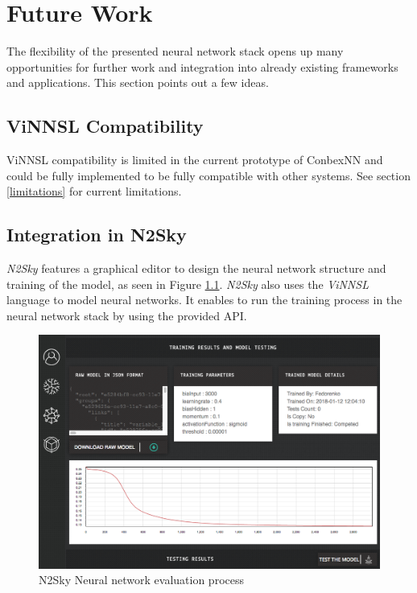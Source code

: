 \chapter{Future Work}\label{future-work}

The flexibility of the presented neural network stack opens up many
opportunities for further work and integration into already existing
frameworks and applications. This section points out a few ideas.

\section{ViNNSL Compatibility}\label{vinnsl-compatibility}

ViNNSL compatibility is limited in the current prototype of ConbexNN and
could be fully implemented to be fully compatible with other systems.
See section \ref{limitations} for current limitations.

\section{Integration in N2Sky}\label{integration-in-n2sky}

\emph{N2Sky} features a graphical editor to design the neural network
structure and training of the model, as seen in Figure \ref{n2sky_eval}.
\emph{N2Sky} also uses the \emph{ViNNSL} language to model neural
networks. It enables to run the training process in the neural network
stack by using the provided API.

\begin{figure}
\centering
\includegraphics[width=12.00000cm]{images/n2sky_eval}
\caption{N2Sky Neural network evaluation process \cite{n2sky-2}
\label{n2sky_eval}}
\end{figure}

